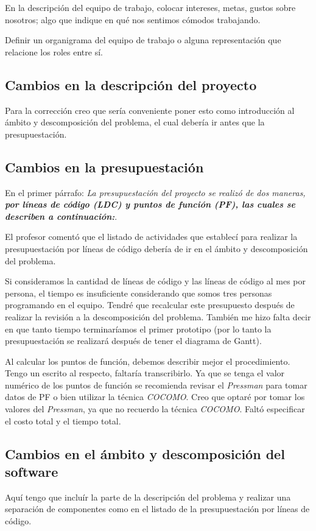 \documentclass[letterpaper]{article}
\begin{document}
En la descripción del equipo de trabajo, colocar intereses, metas, gustos sobre nosotros; algo que indique en qué nos sentimos cómodos trabajando.

Definir un organigrama del equipo de trabajo o alguna representación que relacione los roles entre sí.

\subsection{Cambios en la descripción del proyecto}
Para la corrección creo que sería conveniente poner esto como introducción al ámbito y descomposición del problema, el cual debería ir antes que la presupuestación.

\subsection{Cambios en la presupuestación}
En el primer párrafo: \emph{La presupuestación del proyecto se realizó de dos maneras, \textbf{por líneas de código (LDC) y puntos de función (PF), las cuales se describen a continuación:}}.

El profesor comentó que el listado de actividades que establecí para realizar la presupuestación por líneas de código debería de ir en el ámbito y descomposición del problema.

Si consideramos la cantidad de líneas de código y las líneas de código al mes por persona, el tiempo es insuficiente considerando que somos tres personas programando en el equipo. Tendré que recalcular este presupuesto después de realizar la revisión a la descomposición del problema. También me hizo falta decir en que tanto tiempo terminaríamos el primer prototipo (por lo tanto la presupuestación se realizará después de tener el diagrama de Gantt).

Al calcular los puntos de función, debemos describir mejor el procedimiento. Tengo un escrito al respecto, faltaría transcribirlo. Ya que se tenga el valor numérico de los puntos de función se recomienda revisar el \emph{Pressman} para tomar datos de PF o bien utilizar la técnica \emph{COCOMO}. Creo que optaré por tomar los valores del \emph{Pressman}, ya que no recuerdo la técnica \emph{COCOMO}. Faltó especificar el costo total y el tiempo total.

\subsection{Cambios en el ámbito y descomposición del software}
Aquí tengo que incluír la parte de la descripción del problema y realizar una separación de componentes como en el listado de la presupuestación por líneas de código.
\end{document}
